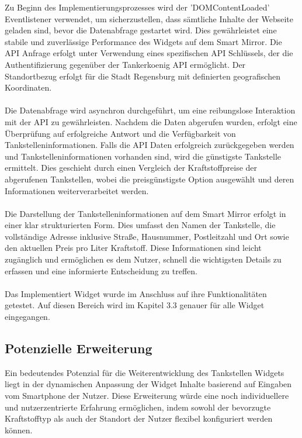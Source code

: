\noindent
Zu Beginn des Implementierungsprozesses wird der 'DOMContentLoaded' Eventlistener verwendet, um sicherzustellen, dass sämtliche Inhalte der Webseite geladen sind, bevor die Datenabfrage gestartet wird. Dies gewährleistet eine stabile und zuverlässige Performance des Widgets auf dem Smart Mirror. Die API Anfrage erfolgt unter Verwendung eines spezifischen API Schlüssels, der die Authentifizierung gegenüber der Tankerkoenig API ermöglicht. Der Standortbezug erfolgt für die Stadt Regensburg mit definierten geografischen Koordinaten. \\ \\
\noindent
Die Datenabfrage wird asynchron durchgeführt, um eine reibungslose Interaktion mit der API zu gewährleisten. Nachdem die Daten abgerufen wurden, erfolgt eine Überprüfung auf erfolgreiche Antwort und die Verfügbarkeit von Tankstelleninformationen. Falls die API Daten erfolgreich zurückgegeben werden und Tankstelleninformationen vorhanden sind, wird die günstigste Tankstelle ermittelt. Dies geschieht durch einen Vergleich der Kraftstoffpreise der abgerufenen Tankstellen, wobei die preisgünstigste Option ausgewählt und deren Informationen weiterverarbeitet werden. \\ \\
\noindent
Die Darstellung der Tankstelleninformationen auf dem Smart Mirror erfolgt in einer klar strukturierten Form. Dies umfasst den Namen der Tankstelle, die vollständige Adresse inklusive Straße, Hausnummer, Postleitzahl und Ort sowie den aktuellen Preis pro Liter Kraftstoff. Diese Informationen sind leicht zugänglich und ermöglichen es dem Nutzer, schnell die wichtigsten Details zu erfassen und eine informierte Entscheidung zu treffen. \\ \\
\noindent
Das Implementiert Widget wurde im Anschluss auf ihre Funktionalitäten getestet. Auf diesen Bereich wird im Kapitel 3.3 genauer für alle Widget eingegangen.

\subsection*{Potenzielle Erweiterung}
Ein bedeutendes Potenzial für die Weiterentwicklung des Tankstellen Widgets liegt in der dynamischen Anpassung der Widget Inhalte basierend auf Eingaben vom Smartphone der Nutzer. Diese Erweiterung würde eine noch individuellere und nutzerzentrierte Erfahrung ermöglichen, indem sowohl der bevorzugte Kraftstofftyp als auch der Standort der Nutzer flexibel konfiguriert werden können.

